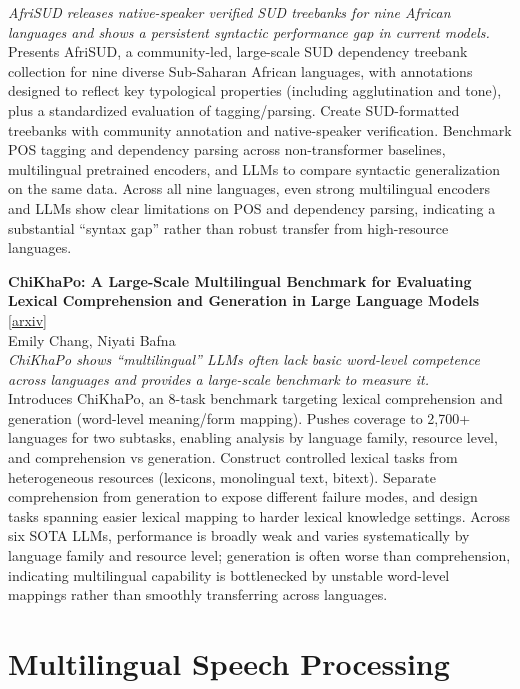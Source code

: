 \documentclass[12pt,letterpaper]{article}
\begin{document}
{\small\textit{AfriSUD releases native-speaker verified SUD treebanks for nine African languages and shows a persistent syntactic performance gap in current models.}}\\[1pt]
{\footnotesize Presents AfriSUD, a community-led, large-scale SUD dependency treebank collection for nine diverse Sub-Saharan African languages, with annotations designed to reflect key typological properties (including agglutination and tone), plus a standardized evaluation of tagging/parsing. Create SUD-formatted treebanks with community annotation and native-speaker verification. Benchmark POS tagging and dependency parsing across non-transformer baselines, multilingual pretrained encoders, and LLMs to compare syntactic generalization on the same data. Across all nine languages, even strong multilingual encoders and LLMs show clear limitations on POS and dependency parsing, indicating a substantial ``syntax gap'' rather than robust transfer from high-resource languages.}

\medskip

{\small\textbf{ChiKhaPo: A Large-Scale Multilingual Benchmark for Evaluating Lexical Comprehension and Generation in Large Language Models}} {\scriptsize[\href{https://arxiv.org/abs/2510.16928}{arxiv}]}\\
{\scriptsize Emily Chang, Niyati Bafna}\\

{\small\textit{ChiKhaPo shows ``multilingual'' LLMs often lack basic word-level competence across languages and provides a large-scale benchmark to measure it.}}\\[1pt]
{\footnotesize Introduces ChiKhaPo, an 8-task benchmark targeting lexical comprehension and generation (word-level meaning/form mapping). Pushes coverage to 2,700+ languages for two subtasks, enabling analysis by language family, resource level, and comprehension vs generation. Construct controlled lexical tasks from heterogeneous resources (lexicons, monolingual text, bitext). Separate comprehension from generation to expose different failure modes, and design tasks spanning easier lexical mapping to harder lexical knowledge settings. Across six SOTA LLMs, performance is broadly weak and varies systematically by language family and resource level; generation is often worse than comprehension, indicating multilingual capability is bottlenecked by unstable word-level mappings rather than smoothly transferring across languages.}

\medskip


\section*{Multilingual Speech Processing}
\end{document}
